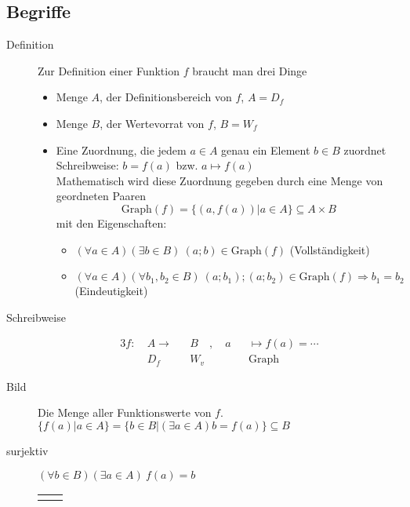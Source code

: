 \documentclass[12pt,a4paper]{article}
\begin{document}
\subsection{Begriffe}
	\begin{description}
		\item[Definition] Zur Definition einer Funktion $f$ braucht man drei Dinge
			\begin{itemize}
				\item Menge $A$, der Definitionsbereich von $f$, $A = D_f$
				\item Menge $B$, der Wertevorrat von $f$, $B = W_f$
				\item Eine Zuordnung, die jedem $a \in A$ genau ein Element $b \in B$ zuordnet \\
					Schreibweise: $b = f(a)$ bzw. $a \longmapsto f(a)$ \\
					Mathematisch wird diese Zuordnung gegeben durch eine Menge von geordneten Paaren
					$$\textrm{Graph}(f) = \lbrace(a,f(a)) | a \in A \rbrace \subseteq A \times B$$
					mit den Eigenschaften:
					\begin{itemize}
						\item $(\forall a \in A)(\exists b \in B)\ (a;b) \in \textrm{Graph}(f)$ (Vollständigkeit)
						\item $(\forall a \in A)(\forall b_1,b_2 \in B)\ (a;b_1);(a;b_2) \in \textrm{Graph}(f)\Rightarrow b_1 = b_2$ (Eindeutigkeit)
					\end{itemize}
			\end{itemize}
		\item[Schreibweise]
			\begin{alignat*}{3}
				f :\ &A \longrightarrow &&B \quad , \quad a &&\longmapsto f(a) = \cdots \\
				&D_f &&W_v && \textrm{Graph}
			\end{alignat*}
		\item[Bild] Die Menge aller Funktionswerte von $f$. $\lbrace f(a) | a \in A \rbrace = \lbrace b \in B  | (\exists a \in A) b = f(a) \rbrace \subseteq B$ 
		\item[surjektiv] $(\forall b \in B)(\exists a \in A) \ f(a) = b$ \\
			\begin{tabularx}{\linewidth}{l|X}
				\adjustbox{valign = t}{
				\begin{tikzpicture}[thick, set/.style = {ellipse, minimum width = 2cm, minimum height = 4cm, draw = black, align = center}, element/.style = {circle, draw = black, minimum size = 0.7, outer sep = 0.05cm}]

\end{tikzpicture}}
\end{tabularx}
\end{description}
\end{document}
